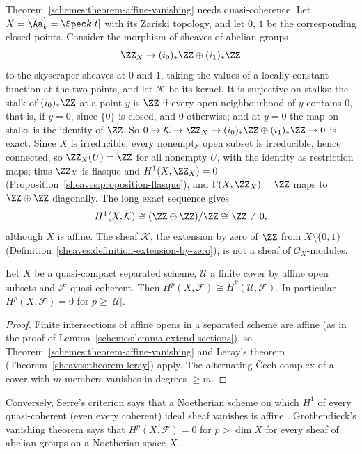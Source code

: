 \begin{counterexample}\label{schemes:counterexample-not-quasi-coherent}
Theorem~\ref{schemes:theorem-affine-vanishing} needs quasi-coherence. Let $X = \Aa^1_k = \Spec k[t]$ with its Zariski topology, and let $0$, $1$ be the corresponding closed points. Consider the morphism of sheaves of
abelian groups
\[
\ZZ_X \to (i_0)_*\ZZ \oplus (i_1)_*\ZZ
\]
to the skyscraper sheaves at $0$ and $1$, taking the values of a locally constant function at the two points, and let $\mathcal{K}$ be its kernel. It is surjective on stalks: the stalk of $(i_0)_*\ZZ$ at a point $y$ is $\ZZ$
if every open neighbourhood of $y$ contains $0$, that is, if $y = 0$, since $\{0\}$ is closed, and $0$ otherwise; and at $y = 0$ the map on stalks is the identity of $\ZZ$. So
$0 \to \mathcal{K} \to \ZZ_X \to (i_0)_*\ZZ \oplus (i_1)_*\ZZ \to 0$ is exact. Since $X$ is irreducible, every nonempty open subset is irreducible, hence connected, so $\ZZ_X(U) = \ZZ$ for all nonempty $U$, with the identity as
restriction maps; thus $\ZZ_X$ is flasque and $H^1(X, \ZZ_X) = 0$ (Proposition~\ref{sheaves:proposition-flasque}), and $\Gamma(X, \ZZ_X) = \ZZ$ maps to $\ZZ \oplus \ZZ$ diagonally. The long exact sequence gives
\[
H^1(X, \mathcal{K}) \cong (\ZZ \oplus \ZZ)/\ZZ \cong \ZZ \neq 0,
\]
although $X$ is affine. The sheaf $\mathcal{K}$, the extension by zero of $\ZZ$ from $X \setminus \{0, 1\}$ (Definition~\ref{sheaves:definition-extension-by-zero}), is not a sheaf of $\mathcal{O}_X$-modules.
\end{counterexample}

\begin{corollary}\label{schemes:corollary-cech-computes}
Let $X$ be a quasi-compact separated scheme, $\mathcal{U}$ a finite cover by affine open subsets and $\mathcal{F}$ quasi-coherent. Then
$H^p(X, \mathcal{F}) \cong \check H^p(\mathcal{U}, \mathcal{F})$. In particular $H^p(X, \mathcal{F}) = 0$ for $p \geq |\mathcal{U}|$.
\end{corollary}

\begin{proof}
Finite intersections of affine opens in a separated scheme are affine (as in the proof of Lemma~\ref{schemes:lemma-extend-sections}), so
Theorem~\ref{schemes:theorem-affine-vanishing} and Leray's theorem (Theorem~\ref{sheaves:theorem-leray}) apply. The alternating \v{C}ech
complex of a cover with $m$ members vanishes in degrees $\geq m$.
\end{proof}

\begin{remark}\label{schemes:remark-serre-criterion}
Conversely, Serre's criterion says that a Noetherian scheme on which $H^1$ of every quasi-coherent (even every coherent) ideal sheaf vanishes is
affine \cite[Theorem III.3.7]{hartshorne-ag}. Grothendieck's vanishing theorem says that $H^p(X, \mathcal{F}) = 0$ for $p > \dim X$ for every sheaf of abelian
groups on a Noetherian space $X$ \cite[Theorem III.2.7]{hartshorne-ag}.
\end{remark}

